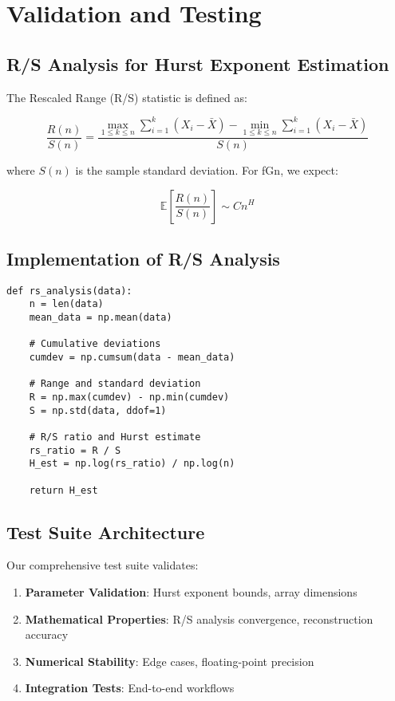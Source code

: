 \documentclass[11pt,a4paper]{article}
\begin{document}
\section{Validation and Testing}

\subsection{R/S Analysis for Hurst Exponent Estimation}

The Rescaled Range (R/S) statistic is defined as:

\begin{equation}
\frac{R(n)}{S(n)} = \frac{\max_{1 \leq k \leq n} \sum_{i=1}^k (X_i - \bar{X}) - \min_{1 \leq k \leq n} \sum_{i=1}^k (X_i - \bar{X})}{S(n)}
\end{equation}

where $S(n)$ is the sample standard deviation. For fGn, we expect:

\begin{equation}
\mathbb{E}\left[\frac{R(n)}{S(n)}\right] \sim C n^H
\end{equation}

\subsection{Implementation of R/S Analysis}

\begin{lstlisting}
def rs_analysis(data):
    n = len(data)
    mean_data = np.mean(data)
    
    # Cumulative deviations
    cumdev = np.cumsum(data - mean_data)
    
    # Range and standard deviation
    R = np.max(cumdev) - np.min(cumdev)
    S = np.std(data, ddof=1)
    
    # R/S ratio and Hurst estimate
    rs_ratio = R / S
    H_est = np.log(rs_ratio) / np.log(n)
    
    return H_est
\end{lstlisting}

\subsection{Test Suite Architecture}

Our comprehensive test suite validates:

\begin{enumerate}
    \item \textbf{Parameter Validation}: Hurst exponent bounds, array dimensions
    \item \textbf{Mathematical Properties}: R/S analysis convergence, reconstruction accuracy
    \item \textbf{Numerical Stability}: Edge cases, floating-point precision
    \item \textbf{Integration Tests}: End-to-end workflows
\end{enumerate}
\end{document}
